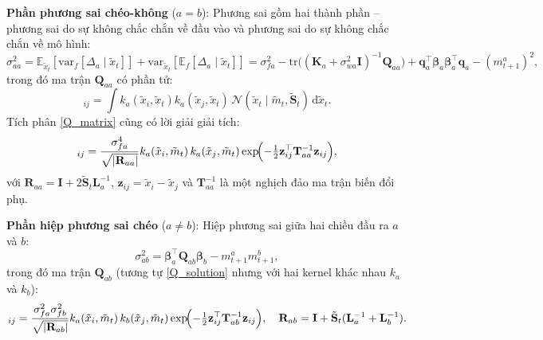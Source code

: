 \textbf{Phần phương sai chéo-không} ($a = b$): Phương sai gồm hai thành phần -- phương sai do sự không chắc chắn về đầu vào và phương sai do sự không chắc chắn về mô hình:
\begin{equation}
    \sigma^2_{aa} = \mathbb{E}_{\tilde{x}_t}[\mathrm{var}_f[\Delta_a \mid \tilde{x}_t]] + \mathrm{var}_{\tilde{x}_t}[\mathbb{E}_f[\Delta_a \mid \tilde{x}_t]] = \sigma_{fa}^2 - \mathrm{tr}\bigl((\mathbf{K}_a + \sigma_{wa}^2 \mathbf{I})^{-1} \mathbf{Q}_{aa}\bigr) + \mathbf{q}_a^\top \boldsymbol{\beta}_a \boldsymbol{\beta}_a^\top \mathbf{q}_a - (m^a_{t+1})^2,
    \label{mm_variance_diagonal}
\end{equation}
trong đó ma trận $\mathbf{Q}_{aa}$ có phần tử:
\begin{equation}
    [Q_{aa}]_{ij} = \int k_a(\tilde{x}_i, \tilde{x}_t) k_a(\tilde{x}_j, \tilde{x}_t)\, \mathcal{N}(\tilde{x}_t \mid \tilde{m}_t, \tilde{\mathbf{S}}_t)\, \mathrm{d}\tilde{x}_t.
    \label{Q_matrix}
\end{equation}
Tích phân \eqref{Q_matrix} cũng có lời giải giải tích:
\begin{equation}
    [Q_{aa}]_{ij} = \frac{\sigma_{fa}^4}{\sqrt{|\mathbf{R}_{aa}|}} k_a(\tilde{x}_i, \tilde{m}_t)\, k_a(\tilde{x}_j, \tilde{m}_t) \exp\!\Bigl(-\tfrac{1}{2} \mathbf{z}_{ij}^\top \mathbf{T}_{aa}^{-1} \mathbf{z}_{ij}\Bigr),
    \label{Q_solution}
\end{equation}
với $\mathbf{R}_{aa} = \mathbf{I} + 2\tilde{\mathbf{S}}_t \mathbf{L}_a^{-1}$, $\mathbf{z}_{ij} = \tilde{x}_i - \tilde{x}_j$ và $\mathbf{T}_{aa}^{-1}$ là một nghịch đảo ma trận biến đổi phụ.

\textbf{Phần hiệp phương sai chéo} ($a \neq b$): Hiệp phương sai giữa hai chiều đầu ra $a$ và $b$:
\begin{equation}
    \sigma^2_{ab} = \boldsymbol{\beta}_a^\top \mathbf{Q}_{ab} \boldsymbol{\beta}_b - m^a_{t+1} m^b_{t+1},
    \label{mm_covariance_offdiag}
\end{equation}
trong đó ma trận $\mathbf{Q}_{ab}$ (tương tự \eqref{Q_solution} nhưng với hai kernel khác nhau $k_a$ và $k_b$):
\begin{equation}
    [Q_{ab}]_{ij} = \frac{\sigma_{fa}^2 \sigma_{fb}^2}{\sqrt{|\mathbf{R}_{ab}|}} k_a(\tilde{x}_i, \tilde{m}_t)\, k_b(\tilde{x}_j, \tilde{m}_t) \exp\!\Bigl(-\tfrac{1}{2} \mathbf{z}_{ij}^\top \mathbf{T}_{ab}^{-1} \mathbf{z}_{ij}\Bigr),\quad \mathbf{R}_{ab} = \mathbf{I} + \tilde{\mathbf{S}}_t(\mathbf{L}_a^{-1} + \mathbf{L}_b^{-1}).
    \label{Q_ab_solution}
\end{equation}

